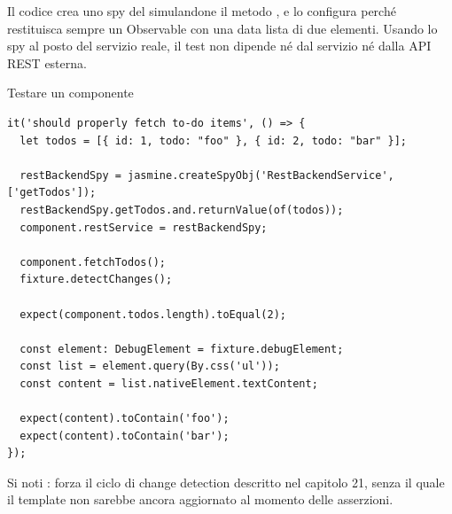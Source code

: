 Il codice crea uno spy del  simulandone il metodo
, e lo configura perché restituisca sempre un Observable con
una data lista di due elementi. Usando lo spy al posto del servizio reale, il
test non dipende né dal servizio né dalla API REST esterna.

\begin{esempio}{Testare un componente}
\begin{affianco}[0.6][c]
\codicepiccolo
\begin{lstlisting}[style=ts, name=todo-page.component.spec.ts]
it('should properly fetch to-do items', () => {
  let todos = [{ id: 1, todo: "foo" }, { id: 2, todo: "bar" }];

  restBackendSpy = jasmine.createSpyObj('RestBackendService', ['getTodos']);
  restBackendSpy.getTodos.and.returnValue(of(todos));
  component.restService = restBackendSpy;

  component.fetchTodos();
  fixture.detectChanges();

  expect(component.todos.length).toEqual(2);

  const element: DebugElement = fixture.debugElement;
  const list = element.query(By.css('ul'));
  const content = list.nativeElement.textContent;

  expect(content).toContain('foo');
  expect(content).toContain('bar');
});
\end{lstlisting}
\risultato
\begin{immagine}
\end{immagine}
\end{affianco}

Si noti : forza il ciclo di change detection
descritto nel capitolo 21, senza il quale il template non sarebbe ancora
aggiornato al momento delle asserzioni.
\end{esempio}

